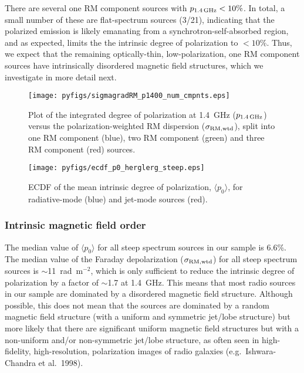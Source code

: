\documentclass{mnras}
\newcommand*\sigmaRMwtd{\sigma_{\rm RM, wtd}}
\begin{document}
There are several one RM component sources with $p_{1.4\, {\rm GHz}} < 10\%$. In total, a small number of these are flat-spectrum sources (3/21), indicating that the polarized emission is likely emanating from a synchrotron-self-absorbed region, and as expected, limits the the intrinsic degree of polarization to $<10$\%. Thus, we expect that the remaining optically-thin, low-polarization, one RM component sources have intrinsically disordered magnetic field structures, which we investigate in more detail next. 

\begin{figure} 
\centering
    \texttt{[image: pyfigs/sigmagradRM\_p1400\_num\_cmpnts.eps]} 
    \caption{ {\small Plot of the integrated degree of polarization at 1.4~GHz ($p_{\rm 1.4\,GHz}$) versus the polarization-weighted 
    RM dispersion ($\sigmaRMwtd$), split into one RM component (blue), two RM component (green) and three RM component (red) sources. }  }
    \label{sigmaRMp1400cmpnts}
\end{figure} 

\begin{figure} 
\centering
    \texttt{[image: pyfigs/ecdf\_p0\_herglerg\_steep.eps]} 
    \caption{ {\small ECDF of the mean intrinsic degree of polarization, $\langle p_0 \rangle$, for radiative-mode (blue) and jet-mode sources (red). } }
    \label{ecdfp0}
\end{figure} 

\subsubsection{Intrinsic magnetic field order} \label{bfieldorderherglerg}
The median value of $\langle p_0 \rangle$ for all steep spectrum sources in our sample is 6.6\%. The median value of the Faraday depolarization ($\sigmaRMwtd$) for all steep spectrum sources is $\sim$11~rad~m$^{-2}$, which is only sufficient to reduce the intrinsic degree of polarization by a factor of $\sim$1.7 at 1.4~GHz. 
This means that most radio sources in our sample are dominated by a disordered magnetic field structure. Although possible, this does not mean that the sources are dominated by a random magnetic field structure (with a uniform and symmetric jet/lobe structure) but more likely that there are significant uniform magnetic field structures but with a non-uniform and/or non-symmetric jet/lobe structure, as often seen in high-fidelity, high-resolution, polarization images of radio galaxies (e.g.~Ishwara-Chandra et al.~1998). 
\end{document}

